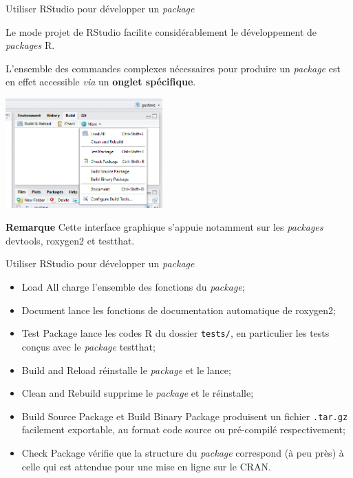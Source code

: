 \documentclass[12pt,handout,ignorenonframetext,]{beamer}
\newcommand{\intertitre}[1]{\textbf{\textcolor{redInsee}{#1}}}
\begin{document}
\begin{frame}{Utiliser RStudio pour développer un \emph{package}}

Le mode \og projet \fg{} de RStudio facilite considérablement le
développement de \emph{packages} R.

\pause L'ensemble des commandes complexes nécessaires pour produire un
\emph{package} est en effet accessible \emph{via} un \textbf{onglet
spécifique}.

\pause \vspace{-0.3cm}

\begin{center}
\includegraphics[height=4.2cm]{build_gustave.png}
\end{center}

\pause \vspace{-0.3cm}\intertitre{Remarque} Cette interface graphique
s'appuie notamment sur les \emph{packages} devtools, roxygen2 et
testthat.

\end{frame}

\begin{frame}[fragile]{Utiliser RStudio pour développer un
\emph{package}}

\begin{itemize}
\item
  \pause \og Load All \fg{} charge l'ensemble des fonctions du
  \emph{package};
\item
  \pause \bigskip \og Document \fg{} lance les fonctions de
  documentation automatique de roxygen2;
\item
  \og Test Package \fg{} lance les codes R du dossier \texttt{tests/},
  en particulier les tests conçus avec le \emph{package} testthat;
\item
  \pause \bigskip \og Build and Reload \fg{} réinstalle le
  \emph{package} et le lance;
\item
  \og Clean and Rebuild \fg{} supprime le \emph{package} et le
  réinstalle;
\item
  \og Build Source Package \fg{} et \og Build Binary Package \fg{}
  produisent un fichier \texttt{.tar.gz} facilement exportable, au
  format code source ou pré-compilé respectivement;
\item
  \pause \bigskip \og Check Package \fg{} vérifie que la structure du
  \emph{package} correspond (à peu près) à celle qui est attendue pour
  une mise en ligne sur le CRAN.
\end{itemize}

\end{frame}
\end{document}
